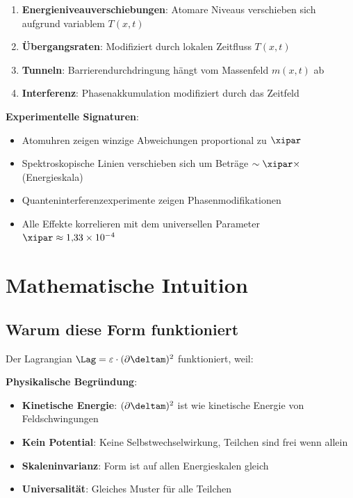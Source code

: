 	\begin{enumerate}
		\item \textbf{Energieniveauverschiebungen}: Atomare Niveaus verschieben sich aufgrund variablem $T(x,t)$
		\item \textbf{Übergangsraten}: Modifiziert durch lokalen Zeitfluss $T(x,t)$
		\item \textbf{Tunneln}: Barrierendurchdringung hängt vom Massenfeld $m(x,t)$ ab
		\item \textbf{Interferenz}: Phasenakkumulation modifiziert durch das Zeitfeld
	\end{enumerate}
	
	\textbf{Experimentelle Signaturen}:
	\begin{itemize}
		\item Atomuhren zeigen winzige Abweichungen proportional zu $\xipar$
		\item Spektroskopische Linien verschieben sich um Beträge $\sim \xipar \times$ (Energieskala)
		\item Quanteninterferenzexperimente zeigen Phasenmodifikationen
		\item Alle Effekte korrelieren mit dem universellen Parameter $\xipar \approx 1{,}33 \times 10^{-4}$
	\end{itemize}

	\section{Mathematische Intuition}
	
	\subsection{Warum diese Form funktioniert}
	
	Der Lagrangian $\Lag = \varepsilon \cdot (\partial \deltam)^2$ funktioniert, weil:
	
	\textbf{Physikalische Begründung}:
	\begin{itemize}
		\item \textbf{Kinetische Energie}: $(\partial \deltam)^2$ ist wie kinetische Energie von Feldschwingungen
		\item \textbf{Kein Potential}: Keine Selbstwechselwirkung, Teilchen sind frei wenn allein
		\item \textbf{Skaleninvarianz}: Form ist auf allen Energieskalen gleich
		\item \textbf{Universalität}: Gleiches Muster für alle Teilchen
	\end{itemize}
	
